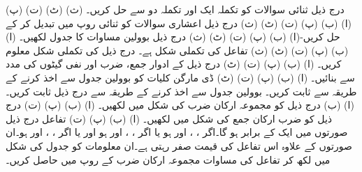 (پ)			(ت)			
(ٹ)			(ث)			
درج ذیل ثنائی سوالات کو تکملہ ایک اور تکملہ دو سے حل کریں۔
(ا)				(ب)			
(پ)			(ت)			
(ٹ)			(ث)			
درج ذیل اعشاری سوالات کو ثنائی روپ  میں تبدیل کر کے حل کریں-(ا) 			(ب) 			
(پ)			(ت)	 	
(ٹ)		(ث) 	
درج ذیل بوولین مساوات کا جدول لکھیں۔
(ا)		(ب) 			
(پ)			(ت)			
(ٹ)			(ث)		
تفاعل    کی تکملی شکل  ہے۔ درج  ذیل کی تکملی شکل معلوم کریں۔
(ا)	  	(ب)   
(پ)		  	(ت)	  	
(ٹ)   
درج ذیل کے ادوار جمع، ضرب اور نفی گیٹوں کی مدد سے بنائیں۔
(ا)		(ب)	
(پ)		(ت)	
(ٹ)	
ڈی مارگن  کلیات کو بوولین جدول سے اخذ کرنے کے طریقہ سے ثابت کریں۔
بوولین جدول سے اخذ کرنے کے طریقہ سے درج ذیل ثابت کریں۔
(ا)		(ب)	
درج ذیل کو مجموعہ ارکان ضرب کی شکل میں لکھیں۔	
(ا)			(ب)	
(پ) 	(ت)	 	
درج ذیل کو ضرب   ارکان جمع کی شکل میں لکھیں۔
(ا)		(ب)			
(پ)		(ت) 
 تفاعل   درج ذیل صورتوں میں ایک   کے برابر ہو گا۔اگر ، ،  اور ہو  یا اگر ، ، اور ہو اور یا اگر ، ، اور ہو۔ان صورتوں کے علاوہ اس تفاعل کی قیمت صفر   رہتی ہے۔ان معلومات  کو جدول کی شکل میں لکھ کر تفاعل کی مساوات مجموعہ ارکان  ضرب کے   روپ میں حاصل کریں۔
